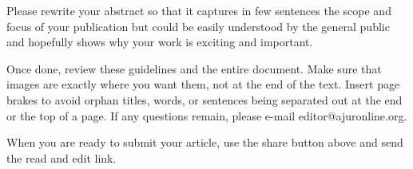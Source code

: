 \documentclass[10pt]{article}
\begin{document}
Please rewrite your abstract so that it captures in few sentences the scope and focus of your publication but could be easily understood by the general public and hopefully shows why your work is exciting and important.

Once done, review these guidelines and the entire document. Make sure that images are exactly where you want them, not at the end of the text. Insert page brakes to avoid orphan titles, words, or sentences being separated out at the end or the top of a page. If any questions remain, please e-mail editor@ajuronline.org.

When you are ready to submit your article, use the share button above and send the read and edit  link.
\end{document}
